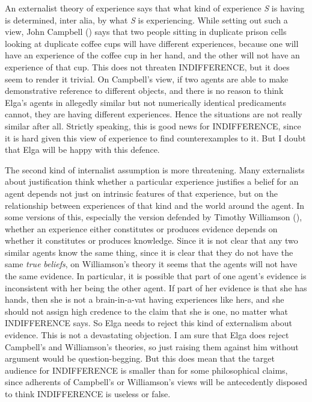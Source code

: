 \documentclass[
  11pt,
  letterpaper,
  DIV=11,
  numbers=noendperiod,
  twoside]{scrartcl}
\begin{document}
An externalist theory of experience says that what kind of experience
\emph{S} is having is determined, inter alia, by what \emph{S} is
experiencing. While setting out such a view, John Campbell
() says that two people
sitting in duplicate prison cells looking at duplicate coffee cups will
have different experiences, because one will have an experience of the
coffee cup in her hand, and the other will not have an experience of
that cup. This does not threaten INDIFFERENCE, but it does seem to
render it trivial. On Campbell's view, if two agents are able to make
demonstrative reference to different objects, and there is no reason to
think Elga's agents in allegedly similar but not numerically identical
predicaments cannot, they are having different experiences. Hence the
situations are not really similar after all. Strictly speaking, this is
good news for INDIFFERENCE, since it is hard given this view of
experience to find counterexamples to it. But I doubt that Elga will be
happy with this defence.

The second kind of internalist assumption is more threatening. Many
externalists about justification think whether a particular experience
justifies a belief for an agent depends not just on intrinsic features
of that experience, but on the relationship between experiences of that
kind and the world around the agent. In some versions of this,
especially the version defended by Timothy Williamson
(), whether an experience
either constitutes or produces evidence depends on whether it
constitutes or produces knowledge. Since it is not clear that any two
similar agents know the same thing, since it is clear that they do not
have the same \emph{true} \emph{beliefs}, on Williamson's theory it
seems that the agents will not have the same evidence. In particular, it
is possible that part of one agent's evidence is inconsistent with her
being the other agent. If part of her evidence is that she has hands,
then she is not a brain-in-a-vat having experiences like hers, and she
should not assign high credence to the claim that she is one, no matter
what INDIFFERENCE says. So Elga needs to reject this kind of externalism
about evidence. This is not a devastating objection. I am sure that Elga
does reject Campbell's and Williamson's theories, so just raising them
against him without argument would be question-begging. But this does
mean that the target audience for INDIFFERENCE is smaller than for some
philosophical claims, since adherents of Campbell's or Williamson's
views will be antecedently disposed to think INDIFFERENCE is useless or
false.
\end{document}
